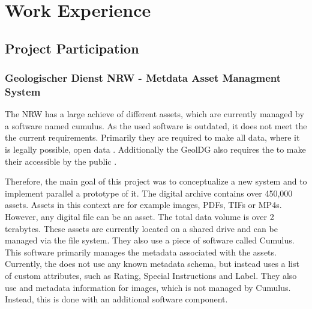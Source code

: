 \documentclass[11pt, titlepage, a4paper]{article}
\begin{document}
\section{Work Experience}
\subsection{Project Participation}
\subsubsection{Geologischer Dienst NRW - Metdata Asset Managment System}
The   NRW has a large achieve of different assets, which are currently managed by a software named cumulus. As the used software is outdated, it does not meet the the current requirements.
Primarily they  are required to make all data, where it is legally possible, open data \cite{GesetzZurForderung2017}.
Additionally the GeolDG also requires the  to make their accessible by the public \cite{GesetzZurStaatlichen2020}.

Therefore, the main goal of this project was to conceptualize a new system and to implement parallel a prototype of it.
The  digital archive contains over 450,000 assets. Assets in this context are for example images, PDFs, TIFs or MP4s. However, any digital file can be an asset. The total data volume is over 2 terabytes.
These assets are currently located on a shared drive and can be managed via the file system. They also use a piece of software called Cumulus. This software primarily manages the metadata associated with the assets. Currently, the  does not use any known metadata schema, but instead uses a list of custom attributes, such as Rating, Special Instructions and Label.
They also use  and  metadata information for images, which is not managed by Cumulus. Instead, this is done with an additional software component.
\end{document}
